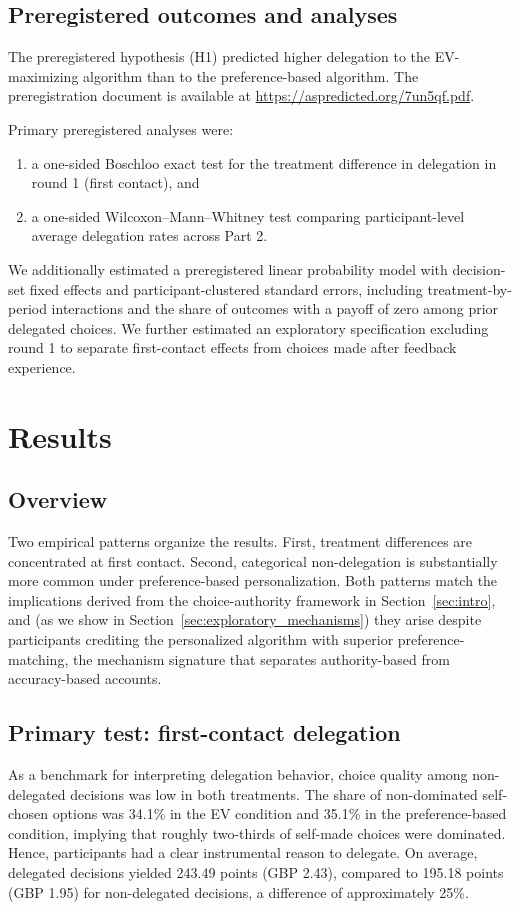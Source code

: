 \documentclass[a4paper, 12pt, fleqn]{article}
\theoremstyle{definition}
\begin{document}
\subsection{Preregistered outcomes and analyses}
The preregistered hypothesis (H1) predicted higher delegation to the EV-maximizing algorithm than to the preference-based algorithm.
The preregistration document is available at {\footnotesize\url{https://aspredicted.org/7un5qf.pdf}}.

Primary preregistered analyses were:
\begin{enumerate}
  \item a one-sided Boschloo exact test for the treatment difference in delegation in round 1 (first contact), and
  \item a one-sided Wilcoxon--Mann--Whitney test comparing participant-level average delegation rates across Part 2.
\end{enumerate}

We additionally estimated a preregistered linear probability model with decision-set fixed effects and participant-clustered standard errors, including treatment-by-period interactions and the share of outcomes with a payoff of zero among prior delegated choices. We further estimated an exploratory specification excluding round 1 to separate first-contact effects from choices made after feedback experience.

\section{Results}
\label{sec:results}

\subsection{Overview}
Two empirical patterns organize the results. First, treatment differences are concentrated at first contact. Second, categorical non-delegation is substantially more common under preference-based personalization. Both patterns match the implications derived from the choice-authority framework in Section~\ref{sec:intro}, and (as we show in Section~\ref{sec:exploratory_mechanisms}) they arise despite participants crediting the personalized algorithm with superior preference-matching, the mechanism signature that separates authority-based from accuracy-based accounts.

\subsection{Primary test: first-contact delegation}
As a benchmark for interpreting delegation behavior, choice quality among non-delegated decisions was low in both treatments. The share of non-dominated self-chosen options was 34.1\% in the EV condition and 35.1\% in the preference-based condition, implying that roughly two-thirds of self-made choices were dominated. Hence, participants had a clear instrumental reason to delegate. On average, delegated decisions yielded 243.49 points (GBP 2.43), compared to 195.18 points (GBP 1.95) for non-delegated decisions, a difference of approximately 25\%.
\end{document}
